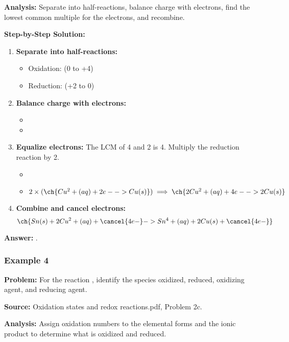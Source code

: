 \documentclass{article}
\begin{document}
\textbf{Analysis:} Separate into half-reactions, balance charge with electrons, find the lowest common multiple for the electrons, and recombine.

\textbf{Step-by-Step Solution:}
\begin{enumerate}
    \item \textbf{Separate into half-reactions:}
        \begin{itemize}
            \item Oxidation:  (0 to +4)
            \item Reduction:  (+2 to 0)
        \end{itemize}
    \item \textbf{Balance charge with electrons:}
        \begin{itemize}
            \item {}
            \item {}
        \end{itemize}
    \item \textbf{Equalize electrons:} The LCM of 4 and 2 is 4. Multiply the reduction reaction by 2.
        \begin{itemize}
            \item {}
            \item $2 \times (\ch{Cu^2+(aq) + 2e- -> Cu(s)}) \implies \ch{2Cu^2+(aq) + 4e- -> 2Cu(s)}$
        \end{itemize}
    \item \textbf{Combine and cancel electrons:}
     \[ \ch{Sn(s) + 2Cu^2+(aq) + \cancel{4e-} -> Sn^4+(aq) + 2Cu(s) + \cancel{4e-}} \]
\end{enumerate}

\textbf{Answer:} \textbf{}.

\subsubsection{Example 4}
\textbf{Problem:} For the reaction , identify the species oxidized, reduced, oxidizing agent, and reducing agent.

\textbf{Source:} Oxidation states and redox reactions.pdf, Problem 2c.

\textbf{Analysis:} Assign oxidation numbers to the elemental forms and the ionic product to determine what is oxidized and reduced.
\end{document}
